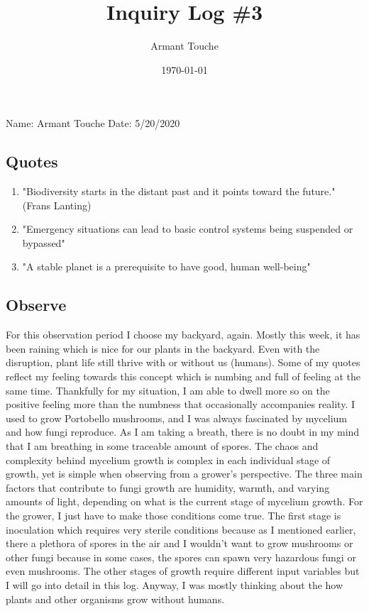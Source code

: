 \documentclass[a4paper,man,biblatex]{apa6}
\title{Inquiry Log \#3}
\author{Armant Touche}
\affiliation{Portland State University}
\date{\today}
\begin{document}
\thispagestyle{otherpage}
\setcounter{biburllcpenalty}{7000}
\setcounter{biburlucpenalty}{8000}


\noindent Name: Armant Touche\newline
\noindent Date: 5/20/2020

\subsection{Quotes}
\begin{enumerate}
    \item "Biodiversity starts in the distant past and it points toward the future." (Frans Lanting)
    \item "Emergency situations can lead to basic control systems being suspended or bypassed" \autocite{account_pan}
    \item "A stable planet is a prerequisite to have good, human well-being" \autocite{stable} 

\end{enumerate}

\subsection{Observe} For this observation period I choose my backyard, again. Mostly this week, it has been raining which is nice for our plants in the backyard. Even with the disruption, plant life still thrive with or without us (humans). Some of my quotes reflect my feeling towards this concept which is numbing and full of feeling at the same time. Thankfully for my situation, I am able to dwell more so on the positive feeling more than the numbness that occasionally accompanies reality. I used to grow Portobello mushrooms, and I was always fascinated by mycelium and how fungi reproduce. As I am taking a breath, there is no doubt in my mind that I am breathing in some traceable amount of spores. The chaos and complexity behind mycelium growth is complex in each individual stage of growth, yet is simple when observing from a grower's perspective. The three main factors that contribute to fungi growth are humidity, warmth, and varying amounts of light, depending on what is the current stage of mycelium growth. For the grower, I just have to make those conditions come true. The first stage is inoculation which requires very sterile conditions because as I mentioned earlier, there a plethora of spores in the air and I wouldn't want to grow mushrooms or other fungi because in some cases, the spores can spawn very hazardous fungi or even mushrooms. The other stages of growth require different input variables but I will go into detail in this log. Anyway, I was mostly thinking about the how plants and other organisms grow without humans. 
\end{document}
